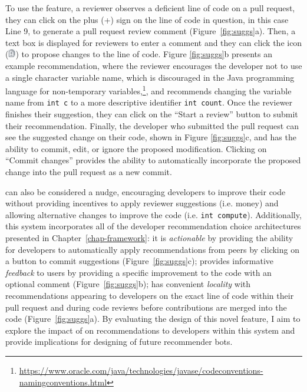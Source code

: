 To use the \suggs feature, a reviewer observes a deficient line of code on a pull request, they can click on the plus (+) sign on the line of code in question, in this case Line 9, to generate a pull request review comment (Figure~\ref{fig:suggs}a). Then, a text box is displayed for reviewers to enter a comment and they can click the \suggs icon (\includegraphics[height=1em]{Chapter-5/images/sugg_icon.png}) to propose changes to the line of code. Figure \ref{fig:suggs}b presents an example recommendation, where the reviewer encourages the developer not to use a single character variable name, which is discouraged in the Java programming language for non-temporary variables,\footnote{\url{https://www.oracle.com/java/technologies/javase/codeconventions-namingconventions.html}}, and recommends changing the variable name from \texttt{int c} to a more descriptive identifier \texttt{int count}. Once the reviewer finishes their suggestion, they can click on the ``Start a review'' button to submit their recommendation. Finally, the developer who submitted the pull request can see the suggested change on their code, shown in Figure \ref{fig:suggs}c, and has the ability to commit, edit, or ignore the proposed modification. Clicking on ``Commit changes'' provides the ability to automatically incorporate the proposed change into the pull request as a new commit.

\suggs can also be considered a nudge, encouraging developers to improve their code without providing incentives to apply reviewer suggestions (i.e. money) and allowing alternative changes to improve the code (i.e. \texttt{int compute}). Additionally, this system incorporates all of the developer recommendation choice architectures presented in Chapter~\ref{chap-framework}: it is \textit{actionable} by providing the ability for developers to automatically apply recommendations from peers by clicking on a button to commit suggestions (Figure~\ref{fig:suggs}c); provides informative \textit{feedback} to users by providing a specific improvement to the code with an optional comment (Figure~\ref{fig:suggs}b); has convenient \textit{locality} with recommendations appearing to developers on the exact line of code within their pull request and during code reviews before contributions are merged into the code (Figure~\ref{fig:suggs}a). By evaluating the design of this novel feature, I aim to explore the impact of \framework on recommendations to developers within this system and provide implications for designing of future recommender bots.

